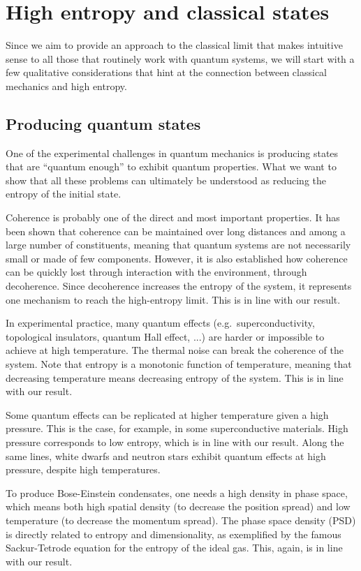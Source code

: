 \documentclass{article}
\begin{document}
\section{High entropy and classical states}

Since we aim to provide an approach to the classical limit that makes intuitive sense to all those that routinely work with quantum systems, we will start with a few qualitative considerations that hint at the connection between classical mechanics and high entropy.

\subsection{Producing quantum states}

One of the experimental challenges in quantum mechanics is producing states that are ``quantum enough'' to exhibit quantum properties. What we want to show that all these problems can ultimately be understood as reducing the entropy of the initial state.

Coherence is probably one of the direct and most important properties. It has been shown that coherence can be maintained over long distances and among a large number of constituents, meaning that quantum systems are not necessarily small or made of few components. However, it is also established how coherence can be quickly lost through interaction with the environment, through decoherence.\cite{RevModPhys.75.715, SCHLOSSHAUER20191} Since decoherence increases the entropy of the system, it represents one mechanism to reach the high-entropy limit. This is in line with our result.

In experimental practice, many quantum effects (e.g.~superconductivity, topological insulators, quantum Hall effect, ...) are harder or impossible to achieve at high temperature. The thermal noise can break the coherence of the system. Note that entropy is a monotonic function of temperature, meaning that decreasing temperature means decreasing entropy of the system. This is in line with our result.

Some quantum effects can be replicated at higher temperature given a high pressure. This is the case, for example, in some superconductive materials.\cite{Drozdov:2015} High pressure corresponds to low entropy, which is in line with our result. Along the same lines, white dwarfs and neutron stars exhibit quantum effects at high pressure, despite high temperatures.

To produce Bose-Einstein condensates, one needs a high density in phase space, which means both high spatial density (to decrease the position spread) and low temperature (to decrease the momentum spread). The phase space density (PSD) is directly related to entropy and dimensionality, as exemplified by the famous Sackur-Tetrode equation for the entropy of the ideal gas. This, again, is in line with our result.
\end{document}
